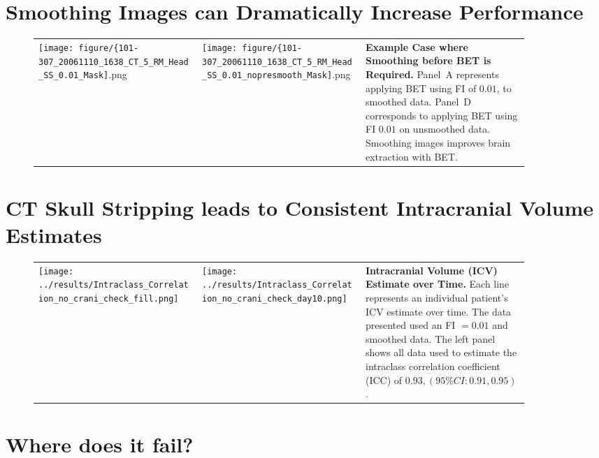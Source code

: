\documentclass[final]{beamer}\usepackage[]{graphicx}\usepackage[]{color}
\begin{document}
\begin{frame}[fragile]
\begin{multicols}{2}
\section{Smoothing Images can Dramatically Increase Performance}

\begin{figure}[htb]
\begin{tabular}{p{0.3\linewidth}p{0.3\linewidth}p{0.3\linewidth}}
	\texttt{[image: figure/\{101-307\_20061110\_1638\_CT\_5\_RM\_Head\_SS\_0.01\_Mask]}.png} &
	\texttt{[image: figure/\{101-307\_20061110\_1638\_CT\_5\_RM\_Head\_SS\_0.01\_nopresmooth\_Mask]}.png} &
	\multirow{2}{\linewidth}[8\baselineskip]{ {\bf Example Case where Smoothing before BET is Required.} Panel~A represents applying BET using FI of $0.01$, to smoothed data. Panel~D corresponds to applying BET using FI $0.01$ on unsmoothed data.  Smoothing images improves brain extraction with BET. 
	}
\end{tabular}
\label{fig:ss_example}
\end{figure}

\section{ CT Skull Stripping leads to Consistent Intracranial Volume Estimates}

\begin{figure}[htb]
\begin{tabular}{p{0.3\linewidth}p{0.3\linewidth}m{0.3\linewidth}}
	\texttt{[image: ../results/Intraclass\_Correlation\_no\_crani\_check\_fill.png]} &
	\texttt{[image: ../results/Intraclass\_Correlation\_no\_crani\_check\_day10.png]} & 
	\multirow{1}{\linewidth}[8\baselineskip]{ {\bf Intracranial Volume (ICV) Estimate over Time.}  Each line represents an individual patient's ICV estimate over time.  The data presented used an FI $= 0.01$ and smoothed data.   The left panel shows all data used to estimate the intraclass correlation coefficient (ICC) of $0.93, (95\% CI: 0.91, 0.95)$.  
	} 
\end{tabular}
\label{fig:icc}
\end{figure}

%

\section{Where does it fail?}


\end{multicols}
\end{frame}
\end{document}
